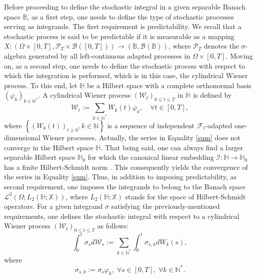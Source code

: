 \documentclass[10pt,number,preprint,times]{elsarticle}
\numberwithin{equation}{section} %
\begin{document}
Before proceeding to define the stochastic integral in a given separable Banach space $\mathbb{B}$, as a first step, one needs to define the type of stochastic processes serving as integrands. The first requirement is predictability. We recall that a stochastic process is said to be predictable if it is measurable as a mapping $X : \left(\Omega \times [0,T],\mathcal{P}_T \times \mathcal{B}([0,T]) \right)  \longrightarrow  \left(\mathbb{B},\mathcal{B}(\mathbb{B})\right)$, where $\mathcal{P}_T$ denotes the $\sigma$-algebra generated by all left-continuous adapted processes in $\Omega \times [0,T].$ Moving on, as a second step, one needs to define the stochastic process with respect to which the integration is performed, which is in this case, the cylindrical Wiener process. To this end, let $\mathbb{H}$ be a Hilbert space with a complete orthonormal basis $\left(\varphi_k\right)_{k \in \mathbb{N}^*}$. A cylindrical Wiener process $\left(\mathcal{W}_t\right)_{0 \leq t \leq T}$ in $\mathbb{H}$ is defined by 
\begin{equation}\label{sum}
\mathcal{W}_t:= \displaystyle \sum_{k \in \mathbb{N}^*} W_k(t) \varphi_k, \quad \forall t \in [0,T],
\end{equation}
where $\left\{\left(W_k(t)\right)_{t \geq 0}, k \in \mathbb{N}\right\}$ is a sequence of independent $\mathcal{F}_t$-adapted one-dimensional Wiener processes. Actually, the series in Equality \eqref{sum} does not converge in the Hilbert space $\mathbb{H}$. That being said, one can always find a larger separable Hilbert space $\mathbb{H}_0$ for which the canonical linear embedding $\mathcal{I} : \mathbb{H} \longrightarrow \mathbb{H}_0$ has a finite Hilbert-Schmidt norm \cite{da2014stochastic}. This consequently yields the convergence of the series in Equality \eqref{sum}. 
Thus, in addition to imposing predictability, as second requirement, one imposes the integrands to belong to the Banach space $\mathcal{L}^2(\Omega;L_2(\mathbb{H};\mathbb{X}))$, where $L_2(\mathbb{H};\mathbb{X})$ stands for the  space of Hilbert-Schmidt operators. For a given integrand $\sigma$ satisfying the previously-mentioned requirements, one defines the stochastic integral with respect to a cylindrical Wiener process $\left(\mathcal{W}_t\right)_{0 \leq t \leq T}$ as follows: 
$$
\displaystyle \int_0^t \sigma_s d\mathcal{W}_s:=\sum_{k \in \mathbb{N}^*} \int_0^t \sigma_{s,k} dW_k(s),
$$
where 
\begin{equation}\label{nt}
\sigma_{s,k}:=\sigma_s \varphi_k,\; \forall s \in [0,T],\; \forall k \in \mathbb{N}^*.
\end{equation}
\end{document}
